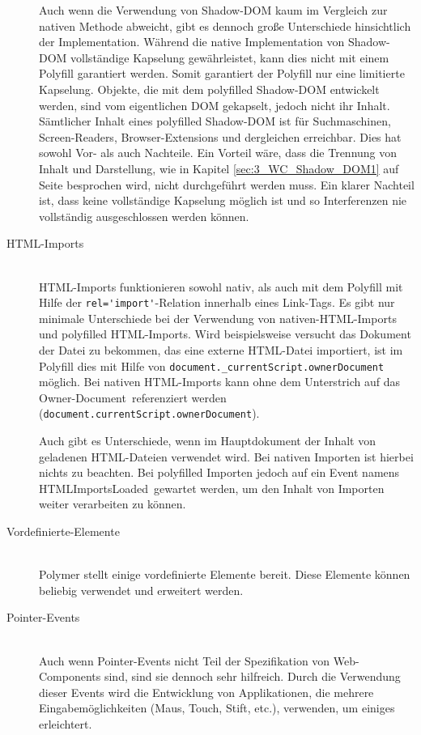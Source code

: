 \begin{description}
Auch wenn die Verwendung von Shadow-DOM kaum im Vergleich zur nativen Methode abweicht, gibt es dennoch große Unterschiede hinsichtlich der Implementation. Während die native Implementation von Shadow-DOM vollständige Kapselung gewährleistet, kann dies nicht mit einem Polyfill garantiert werden. Somit garantiert der Polyfill nur eine limitierte Kapselung. Objekte, die mit dem polyfilled Shadow-DOM entwickelt werden, sind vom eigentlichen DOM gekapselt, jedoch nicht ihr Inhalt. Sämtlicher Inhalt eines polyfilled Shadow-DOM ist für Suchmaschinen, Screen-Readers, Browser-Extensions und dergleichen erreichbar. Dies hat sowohl Vor- als auch Nachteile. Ein Vorteil wäre, dass die Trennung von Inhalt und Darstellung, wie in Kapitel \ref{sec:3_WC_Shadow_DOM1} auf Seite \pageref{sec:3_WC_Shadow_DOM1} besprochen wird, nicht durchgeführt werden muss. Ein klarer Nachteil ist, dass keine vollständige Kapselung möglich ist und so Interferenzen nie vollständig ausgeschlossen werden können.

\item[HTML-Imports] \hfill \\
HTML-Imports funktionieren sowohl nativ, als auch mit dem Polyfill mit Hilfe der \lstinline|rel='import'|-Relation innerhalb eines Link-Tags. Es gibt nur minimale Unterschiede bei der Verwendung von nativen-HTML-Imports und polyfilled HTML-Imports. Wird beispielsweise versucht das Dokument der Datei zu bekommen, das eine externe HTML-Datei importiert, ist im Polyfill dies mit Hilfe von \lstinline|document._currentScript.ownerDocument| möglich. Bei nativen HTML-Imports kann ohne dem Unterstrich auf das \glqq Owner-Document\grqq\ referenziert werden (\lstinline|document.currentScript.ownerDocument|).

Auch gibt es Unterschiede, wenn im Hauptdokument der Inhalt von geladenen HTML-Dateien verwendet wird. Bei nativen Importen ist hierbei nichts zu beachten. Bei polyfilled Importen jedoch auf ein Event namens \glqq HTMLImportsLoaded\grqq\ gewartet werden, um den Inhalt von Importen weiter verarbeiten zu können.

\item[Vordefinierte-Elemente] \hfill \\
Polymer stellt einige vordefinierte Elemente bereit. Diese Elemente können beliebig verwendet und erweitert werden.

\item[Pointer-Events] \hfill \\
Auch wenn Pointer-Events nicht Teil der Spezifikation von Web-Components sind, sind sie dennoch sehr hilfreich. Durch die Verwendung dieser Events wird die Entwicklung von Applikationen, die mehrere Eingabemöglichkeiten (Maus, Touch, Stift, etc.), verwenden, um einiges erleichtert.


\end{description}
